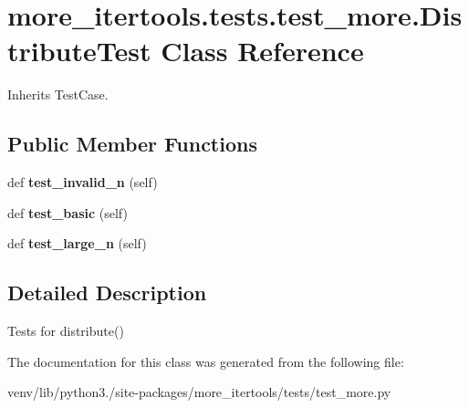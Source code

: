 \hypertarget{classmore__itertools_1_1tests_1_1test__more_1_1_distribute_test}{}\section{more\+\_\+itertools.\+tests.\+test\+\_\+more.\+Distribute\+Test Class Reference}
\label{classmore__itertools_1_1tests_1_1test__more_1_1_distribute_test}


Inherits Test\+Case.

\subsection*{Public Member Functions}
\begin{DoxyCompactItemize}
\item 
\mbox{\label{classmore__itertools_1_1tests_1_1test__more_1_1_distribute_test_a6c029735ca27b80b1d10d118545318ba}} 
def {\bfseries test\+\_\+invalid\+\_\+n} (self)
\item 
\mbox{\label{classmore__itertools_1_1tests_1_1test__more_1_1_distribute_test_ad37f8ad6b2aad60de0ec0601b3f64056}} 
def {\bfseries test\+\_\+basic} (self)
\item 
\mbox{\label{classmore__itertools_1_1tests_1_1test__more_1_1_distribute_test_a0f1cba6ba7c3e8c9c2196a1301a3a862}} 
def {\bfseries test\+\_\+large\+\_\+n} (self)
\end{DoxyCompactItemize}


\subsection{Detailed Description}
\begin{DoxyVerb}Tests for distribute()\end{DoxyVerb}
 

The documentation for this class was generated from the following file\+:\begin{DoxyCompactItemize}
\item 
venv/lib/python3./site-\/packages/more\+\_\+itertools/tests/test\+\_\+more.\+py\end{DoxyCompactItemize}
